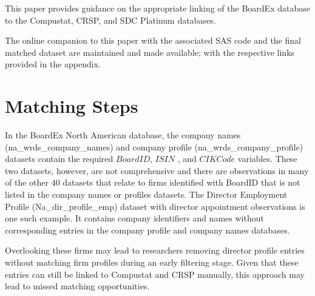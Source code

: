 \documentclass[12pt]{article}
\begin{document}
\noindent
This paper provides guidance on the appropriate linking of the BoardEx database to the Compustat, CRSP, and SDC Platinum databases.

The online companion to this paper with the associated SAS code and the final matched dataset are maintained and made available; with the respective links provided in the appendix.


\section{Matching Steps} \label{sec:Matching}

In the BoardEx North American database, the company names (na\_wrds\_company\_names) and company profile (na\_wrds\_company\_profile) datasets contain the required $BoardID$, $ISIN$ , and $CIKCode$ variables.
These two datasets, however, are not comprehensive and there are observations in many of the other 40 datasets that relate to firms identified with BoardID that is not listed in the company names or profiles datasets.
The Director Employment Profile (Na\_dir\_profile\_emp) dataset with director appointment observations is one such example.
It contains company identifiers and names without corresponding entries in the company profile and company names databases.

Overlooking these firms may lead to researchers removing director profile entries without matching firm profiles during an early filtering stage.
Given that these entries can still be linked to Compustat and CRSP manually, this approach may lead to missed matching opportunities.
\end{document}

